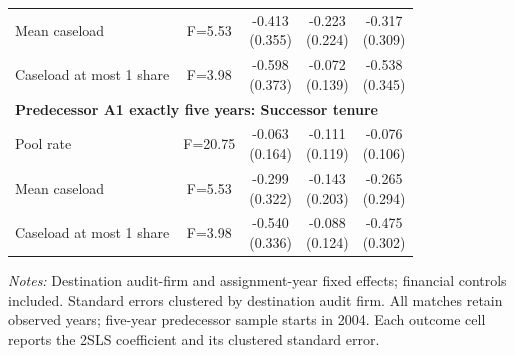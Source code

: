 \begin{table}[htbp]
\begin{threeparttable}
\begin{tabular}{p{}cccc}
Mean caseload & F=5.53 & \shortstack{-0.413\\(0.355)} & \shortstack{-0.223\\(0.224)} & \shortstack{-0.317\\(0.309)} \\
Caseload at most 1 share & F=3.98 & \shortstack{-0.598\\(0.373)} & \shortstack{-0.072\\(0.139)} & \shortstack{-0.538\\(0.345)} \\
\multicolumn{5}{l}{\textbf{Predecessor A1 exactly five years: Successor tenure}} \\
Pool rate & F=20.75 & \shortstack{-0.063\\(0.164)} & \shortstack{-0.111\\(0.119)} & \shortstack{-0.076\\(0.106)} \\
Mean caseload & F=5.53 & \shortstack{-0.299\\(0.322)} & \shortstack{-0.143\\(0.203)} & \shortstack{-0.265\\(0.294)} \\
Caseload at most 1 share & F=3.98 & \shortstack{-0.540\\(0.336)} & \shortstack{-0.088\\(0.124)} & \shortstack{-0.475\\(0.302)} \\
\bottomrule
\end{tabular}
\begin{tablenotes}\footnotesize
\item \raggedright \textit{Notes:} Destination audit-firm and assignment-year fixed effects; financial controls included. Standard errors clustered by destination audit firm. All matches retain observed years; five-year predecessor sample starts in 2004. Each outcome cell reports the 2SLS coefficient and its clustered standard error.
\end{tablenotes}
\end{threeparttable}
\end{table}
